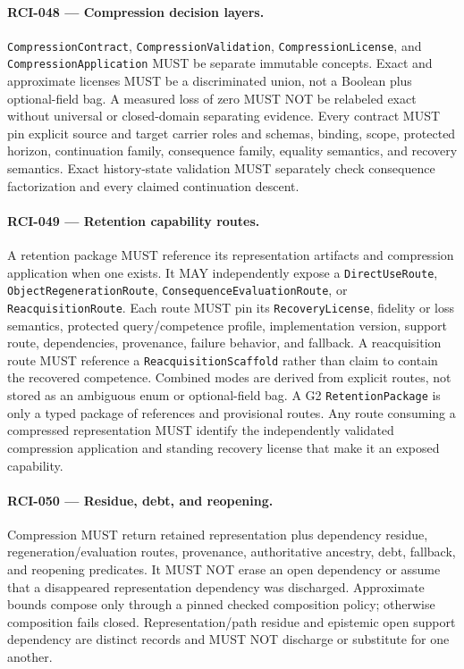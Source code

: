 \documentclass[11pt]{article}
\begin{document}
\paragraph{RCI-048 --- Compression decision layers.}
\texttt{CompressionContract}, \texttt{CompressionValidation},
\texttt{CompressionLicense}, and \texttt{CompressionApplication} MUST be
separate immutable concepts. Exact and approximate licenses MUST be a
discriminated union, not a Boolean plus optional-field bag. A measured loss of
zero MUST NOT be relabeled exact without universal or closed-domain separating
evidence. Every contract MUST pin explicit source and target carrier roles and
schemas, binding, scope, protected horizon, continuation family, consequence
family, equality semantics, and recovery semantics. Exact history-state
validation MUST separately check consequence factorization and every claimed
continuation descent.

\paragraph{RCI-049 --- Retention capability routes.}
A retention package MUST reference its representation artifacts and compression
application when one exists. It MAY independently expose a
\texttt{DirectUseRoute}, \texttt{ObjectRegenerationRoute},
\texttt{ConsequenceEvaluationRoute}, or \texttt{ReacquisitionRoute}. Each route
MUST pin its \texttt{RecoveryLicense}, fidelity or loss semantics, protected
query/competence profile, implementation version, support route, dependencies,
provenance, failure behavior, and fallback. A reacquisition route MUST reference
a \texttt{ReacquisitionScaffold} rather than claim to contain the recovered
competence. Combined modes are derived from explicit routes, not stored as an
ambiguous enum or optional-field bag.
A G2 \texttt{RetentionPackage} is only a typed package of references and
provisional routes. Any route consuming a compressed representation MUST
identify the independently validated compression application and standing
recovery license that make it an exposed capability.

\paragraph{RCI-050 --- Residue, debt, and reopening.}
Compression MUST return retained representation plus dependency residue,
regeneration/evaluation routes, provenance, authoritative ancestry, debt,
fallback, and reopening predicates. It MUST NOT erase an open dependency or
assume that a disappeared representation dependency was discharged.
Approximate bounds compose only through a pinned checked composition policy;
otherwise composition fails closed.
Representation/path residue and epistemic open support dependency are distinct
records and MUST NOT discharge or substitute for one another.
\end{document}
